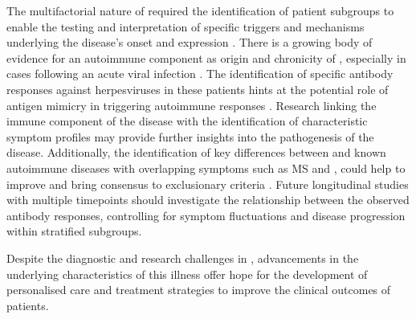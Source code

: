 The multifactorial nature of \cfs required the identification of patient subgroups to enable the testing and interpretation of specific triggers and mechanisms underlying the disease's onset and expression \citep{jason2005ChronicFatigue}.
There is a growing body of evidence for an autoimmune component as origin and chronicity of \cfs, especially in cases following an acute viral infection \citep{blomberg2018InfectionEliciteda, sotznyMyalgicEncephalomyelitisChronic2018}.
The identification of specific antibody responses against herpesviruses in these patients hints at the potential role of antigen mimicry in triggering autoimmune responses \citep{phelanPotentialAntigenicMimicry2020, sepulveda2022RevisitingIgG}.
Research linking the immune component of the disease with the identification of characteristic symptom profiles may provide further insights into the pathogenesis of the disease.
Additionally, the identification of key differences between \cfs and known autoimmune diseases with overlapping symptoms such as MS and \LC, could help to improve and bring consensus to \cfs exclusionary criteria \citep{jason2023EstablishingConsensus}.
Future longitudinal studies with multiple timepoints should investigate the relationship between the observed antibody responses, controlling for symptom fluctuations and disease progression within stratified subgroups.

Despite the diagnostic and research challenges in \cfs, advancements in the underlying characteristics of this illness offer hope for the development of personalised care and treatment strategies to improve the clinical outcomes of patients.






